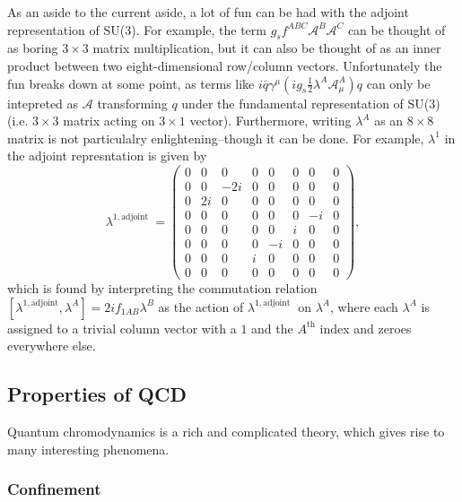 As an aside to the current aside, a lot of fun can be had with the adjoint representation of SU(3). For example, the term $g_s f^{ABC} \mathcal{A}^B \mathcal{A}^C$  can be thought of as boring $3\times3$ matrix multiplication, but it can also be thought of as an inner product between two eight-dimensional row/column vectors. Unfortunately the fun breaks down at some point, as terms like $i \bar{q} \gamma^\mu (i g_s \frac{1}{2} \lambda^A \mathcal{A}_\mu^A) q$  can only be intepreted as $\mathcal{A}$ transforming $q$ under the fundamental representation of SU(3) (i.e. $3\times3$ matrix acting on $3\times1$ vector). Furthermore, writing $\lambda^A$ as an $8\times8$ matrix is not particulalry enlightening--though it can be done. For example, $\lambda^1$ in the adjoint represntation is given by
%
\begin{equation*}
\lambda^{1, \text {adjoint }}=\left(\begin{array}{cccccccc}
0 & 0 & 0 & 0 & 0 & 0 & 0 & 0 \\
0 & 0 & -2i & 0 & 0 & 0 & 0 & 0 \\
0 & 2i & 0 & 0 & 0 & 0 & 0 & 0 \\
0 & 0 & 0 & 0 & 0 & 0 & -i & 0 \\
0 & 0 & 0 & 0 & 0 & i & 0 & 0 \\
0 & 0 & 0 & 0 & -i & 0 & 0 & 0 \\
0 & 0 & 0 & i & 0 & 0 & 0 & 0 \\
0 & 0 & 0 & 0 & 0 & 0 & 0 & 0
\end{array}\right),
\end{equation*}
which is found by interpreting the commutation relation $[\lambda^{1, \text {adjoint}}, \lambda^A] = 2if_{1AB}\lambda^B$ as the action of $\lambda^{1, \text {adjoint }}$ on $\lambda^A$, where each $\lambda^A$ is assigned to a trivial column vector with a $1$ and the $A^{\text {th}}$ index and zeroes everywhere else.
%


\subsection{Properties of QCD}
\label{sec:qcd_features}

Quantum chromodynamics is a rich and complicated theory, which gives rise to many interesting phenomena.

\subsubsection{Confinement}
\label{sec:qcd_confinement}

